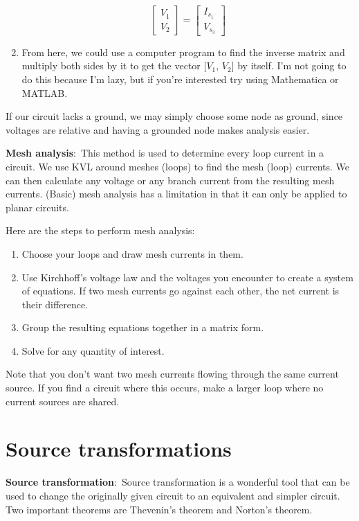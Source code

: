 \documentclass[nobib]{tufte-handout}
\newcommand{\defn}[2]{\noindent\textbf{#1}:\ #2}
\begin{document}
\begin{enumerate}
\[    \begin{bmatrix}
        V_1 \\
        V_2
    \end{bmatrix}
     =
    \begin{bmatrix}
        I_{s_1} \\
        V_{s_3}
    \end{bmatrix} \]
    \item From here, we could use a computer program to find the inverse matrix
    and multiply both sides by it to get the vector [$V_1$, $V_2$] by itself. 
    I'm not going to do this because I'm lazy, but if you're interested try 
    using Mathematica or MATLAB. 
\end{enumerate}

If our circuit lacks a ground, we may simply choose some node as ground, since
voltages are relative and having a grounded node makes analysis easier. 



\defn{Mesh analysis}{This method is used to determine every loop current in a circuit. We
use KVL around meshes (loops) to find the mesh (loop) currents. We
can then calculate any voltage or any branch current from the resulting
mesh currents. (Basic) mesh analysis has a limitation in that it can only
be applied to planar circuits}.

Here are the steps to perform mesh analysis: 
\begin{enumerate}
    \item Choose your loops and draw mesh currents in them. 
    \item Use Kirchhoff's voltage law and the voltages you encounter 
    to create a system of equations. If two mesh currents 
    go against each other, the net current is their difference. 
    \item Group the resulting equations together in a matrix form.
    \item Solve for any quantity of interest. 
\end{enumerate}

Note that you don't want two mesh currents flowing through the same 
current source. If you find a circuit where this occurs, make a 
larger loop where no current sources are shared. 

\pagebreak 

\section{Source transformations}
\defn{Source transformation}{Source transformation is a 
wonderful tool that can be used to change the
originally given circuit to an equivalent and simpler circuit}.
Two important theorems are Thevenin's theorem and Norton's theorem.
\end{document}
